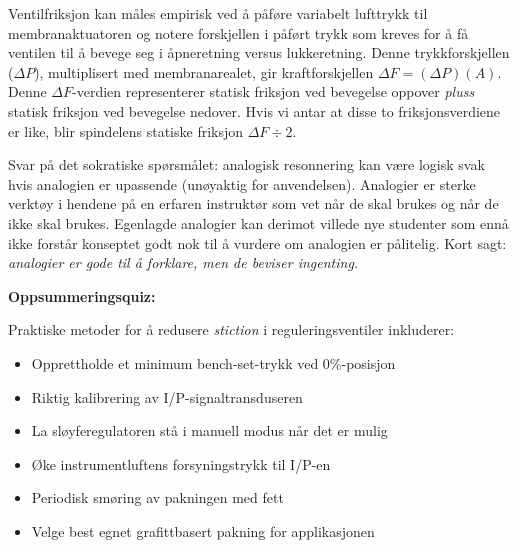 \vskip 10pt

Ventilfriksjon kan måles empirisk ved å påføre variabelt lufttrykk til membranaktuatoren og notere forskjellen i påført trykk som kreves for å få ventilen til å bevege seg i åpneretning versus lukkeretning. Denne trykkforskjellen ($\Delta P$), multiplisert med membranarealet, gir kraftforskjellen $\Delta F = (\Delta P)(A)$. Denne $\Delta F$-verdien representerer statisk friksjon ved bevegelse oppover {\it pluss} statisk friksjon ved bevegelse nedover. Hvis vi antar at disse to friksjonsverdiene er like, blir spindelens statiske friksjon $\Delta F \div 2$.

\vskip 10pt

Svar på det sokratiske spørsmålet: analogisk resonnering kan være logisk svak hvis analogien er upassende (unøyaktig for anvendelsen). Analogier er sterke verktøy i hendene på en erfaren instruktør som vet når de skal brukes og når de ikke skal brukes. Egenlagde analogier kan derimot villede nye studenter som ennå ikke forstår konseptet godt nok til å vurdere om analogien er pålitelig. Kort sagt: {\it analogier er gode til å forklare, men de beviser ingenting.}

\vfil \eject

\noindent
{\bf Oppsummeringsquiz:}

Praktiske metoder for å redusere {\it stiction} i reguleringsventiler inkluderer:

\begin{itemize}
\item{} Opprettholde et minimum bench-set-trykk ved 0\%-posisjon
\vskip 5pt
\item{} Riktig kalibrering av I/P-signaltransduseren
\vskip 5pt
\item{} La sløyferegulatoren stå i manuell modus når det er mulig
\vskip 5pt
\item{} Øke instrumentluftens forsyningstrykk til I/P-en
\vskip 5pt
\item{} Periodisk smøring av pakningen med fett
\vskip 5pt
\item{} Velge best egnet grafittbasert pakning for applikasjonen
\end{itemize}





